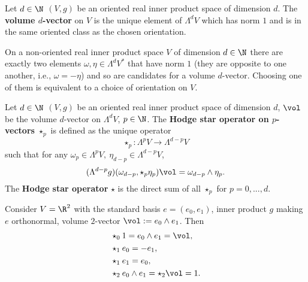 \begin{definition}
  Let
    $d \in \N$
    $(V, g)$ be an oriented real inner product space of dimension $d$.
  The \textbf{volume $d$-vector} on $V$ is the unique element of $\Lambda^d V$
  which has norm $1$ and is in the same oriented class as the chosen
  orientation.
\end{definition}
\begin{remark}
  On a non-oriented real inner product space $V$ of dimension $d \in \N$
  there are exactly two elements $\omega, \eta \in\Lambda^d V^*$ that have norm
  $1$ (they are opposite to one another, i.e., $\omega = -\eta$) and so are
  candidates for a volume $d$-vector.
  Choosing one of them is equivalent to a choice of orientation on $V$.
\end{remark}
\begin{definition}
  Let
    $d \in \N$
    $(V, g)$ be an oriented real inner product space of dimension $d$,
    $\vol$ be the volume $d$-vector on $\Lambda^d V$,
    $p \in \N$.
  The \textbf{Hodge star operator on $p$-vectors} $\star_p$
  is defined as the unique operator
  \begin{equation}
    \star_p \colon \Lambda^p V \to \Lambda^{d - p} V
  \end{equation}
  such that for any
  $\omega_p \in \Lambda^p V,\ \eta_{d - p} \in \Lambda^{d - p} V$,
  \begin{equation}
    (\Lambda^{d - p} g)(\omega_{d - p}, \star_p \eta_p) \vol
    = \omega_{d - p} \wedge \eta_p.
  \end{equation}
  The \textbf{Hodge star operator} $\star$ is the direct sum of all $\star_p$
  for $p = 0, ..., d$.
\end{definition}
\begin{example}
  Consider
    $V = \R^2$ with the standard basis $e = (e_0, e_1)$,
    inner product $g$ making $e$ orthonormal,
    volume $2$-vector $\vol := e_0 \wedge e_1$.
  Then
  \begin{subequations}
    \begin{align}
      & \star_0 1 = e_0 \wedge e_1 = \vol, \\
      & \star_1 e_0 = - e_1, \\
      & \star_1 e_1 = e_0, \\
      & \star_2 e_0 \wedge e_1 = \star_2 \vol = 1.
    \end{align}
  \end{subequations}
\end{example}
